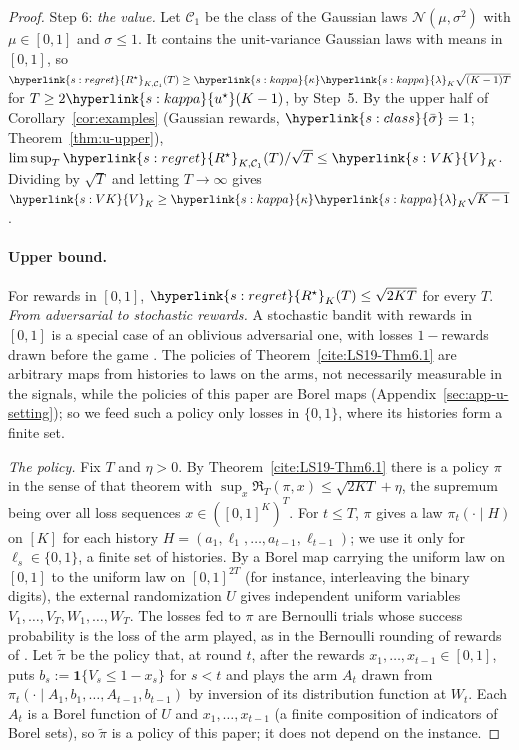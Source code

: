 \documentclass[11pt]{article}
\DeclareRobustCommand{\sy}[2]{{\hyperlink{#1}{#2}}}
\newcommand{\1}{\mathbf{1}}
\newcommand{\Rs}{\sy{s:regret}{R^\star}}
\newcommand{\sbar}{\sy{s:class}{\bar\sigma}}
\newcommand{\VK}{\sy{s:VK}{V}}
\newcommand{\us}{\sy{s:kappa}{u^\star}}
\newcommand{\kap}{\sy{s:kappa}{\kappa}}
\newcommand{\lamK}{\sy{s:kappa}{\lambda}}
\begin{document}
\begin{proof}
Step 6: \emph{the value.} Let $\mathcal C_1$ be the class of the Gaussian laws $\mathcal N(\mu,\sigma^2)$ with $\mu\in[0,1]$ and $\sigma\le1$. It contains the
unit-variance Gaussian laws with means in $[0,1]$, so $\Rs_{K,\mathcal C_1}(T)\ge\kap\lamK_K\sqrt{(K-1)T}$ for $T\ge2\us(K-1)$, by Step~5. By the upper half of
Corollary~\ref{cor:examples} (Gaussian rewards, $\sbar=1$; Theorem~\ref{thm:u-upper}), $\limsup_T\Rs_{K,\mathcal C_1}(T)/\sqrt T\le\VK_K$. Dividing by $\sqrt T$
and letting $T\to\infty$ gives $\VK_K\ge\kap\lamK_K\sqrt{K-1}$.

\paragraph{Upper bound.} For rewards in $[0,1]$, $\Rs_K(T)\le\sqrt{2KT}$ for every $T$. \emph{From adversarial to stochastic rewards.} A
stochastic bandit with rewards in $[0,1]$ is a special case of an oblivious adversarial one, with losses $1-$rewards drawn before the game
\citep[Section~1]{AB09}. The policies of Theorem~\ref{cite:LS19-Thm6.1} are arbitrary maps from
histories to laws on the arms, not necessarily measurable in the signals, while the policies of this paper are Borel maps
(Appendix~\ref{sec:app-u-setting}); so we feed such a policy only losses in $\{0,1\}$, where its histories form a finite set.

\emph{The policy.} Fix $T$ and $\eta>0$. By Theorem~\ref{cite:LS19-Thm6.1} there is a policy $\pi$ in the sense of that theorem with
$\sup_x\mathfrak R_T(\pi,x)\le\sqrt{2KT}+\eta$, the supremum being over all loss sequences $x\in([0,1]^K)^T$. For $t\le T$, $\pi$ gives a law
$\pi_t(\cdot\mid H)$ on $[K]$ for each history $H=(a_1,\ell_1,\dots,a_{t-1},\ell_{t-1})$; we use it only for $\ell_s\in\{0,1\}$, a finite set of
histories. By a Borel map carrying the uniform law on $[0,1]$ to the uniform law on $[0,1]^{2T}$ (for instance, interleaving the binary
digits), the external randomization $U$ gives independent uniform variables $V_1,\dots,V_T,W_1,\dots,W_T$. The losses fed to $\pi$ are
Bernoulli trials whose success probability is the loss of the arm played, as in the Bernoulli rounding of rewards of
\citet[Section~1.2, Algorithm~2]{AG12}. Let $\tilde\pi$ be the policy that, at round $t$, after the rewards $x_1,\dots,x_{t-1}\in[0,1]$, puts
$b_s:=\1\{V_s\le1-x_s\}$ for $s<t$ and plays the arm $A_t$ drawn from $\pi_t(\cdot\mid A_1,b_1,\dots,A_{t-1},b_{t-1})$ by inversion of its
distribution function at $W_t$. Each $A_t$ is a Borel function of $U$ and $x_1,\dots,x_{t-1}$ (a finite composition of indicators of Borel
sets), so $\tilde\pi$ is a policy of this paper; it does not depend on the instance.


\end{proof}
\end{document}
